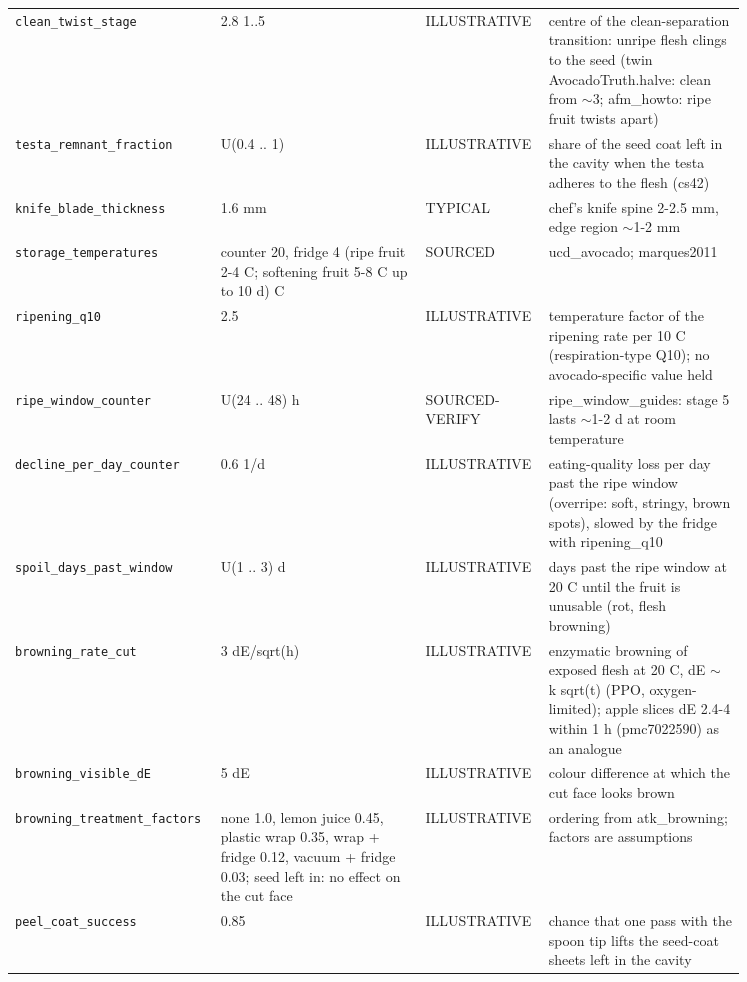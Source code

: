 \documentclass[10.5pt,a4paper]{article}
\begin{document}
{\begin{longtable}{@{}p{0.2\linewidth}p{0.27\linewidth}p{0.12\linewidth}p{0.26\linewidth}@{}}
\texttt{clean\_\allowbreak{}twist\_\allowbreak{}stage} & 2.8 1..5 & ILLUSTRATIVE & centre of the clean-separation transition: unripe flesh clings to the seed (twin AvocadoTruth.halve: clean from $\sim$3; afm\_howto: ripe fruit twists apart) \\
\texttt{testa\_\allowbreak{}remnant\_\allowbreak{}fraction} & U(0.4 .. 1) & ILLUSTRATIVE & share of the seed coat left in the cavity when the testa adheres to the flesh (cs42) \\
\texttt{knife\_\allowbreak{}blade\_\allowbreak{}thickness} & 1.6 mm & TYPICAL & chef's knife spine 2-2.5 mm, edge region $\sim$1-2 mm \\
\texttt{storage\_\allowbreak{}temperatures} & counter 20, fridge 4 (ripe fruit 2-4 C; softening fruit 5-8 C up to 10 d) C & SOURCED & ucd\_avocado; marques2011 \\
\texttt{ripening\_\allowbreak{}q10} & 2.5 & ILLUSTRATIVE & temperature factor of the ripening rate per 10 C (respiration-type Q10); no avocado-specific value held \\
\texttt{ripe\_\allowbreak{}window\_\allowbreak{}counter} & U(24 .. 48) h & SOURCED-VERIFY & ripe\_window\_guides: stage 5 lasts $\sim$1-2 d at room temperature \\
\texttt{decline\_\allowbreak{}per\_\allowbreak{}day\_\allowbreak{}counter} & 0.6 1/d & ILLUSTRATIVE & eating-quality loss per day past the ripe window (overripe: soft, stringy, brown spots), slowed by the fridge with ripening\_q10 \\
\texttt{spoil\_\allowbreak{}days\_\allowbreak{}past\_\allowbreak{}window} & U(1 .. 3) d & ILLUSTRATIVE & days past the ripe window at 20 C until the fruit is unusable (rot, flesh browning) \\
\texttt{browning\_\allowbreak{}rate\_\allowbreak{}cut} & 3 dE/sqrt(h) & ILLUSTRATIVE & enzymatic browning of exposed flesh at 20 C, dE $\sim$ k sqrt(t) (PPO, oxygen-limited); apple slices dE 2.4-4 within 1 h (pmc7022590) as an analogue \\
\texttt{browning\_\allowbreak{}visible\_\allowbreak{}dE} & 5 dE & ILLUSTRATIVE & colour difference at which the cut face looks brown \\
\texttt{browning\_\allowbreak{}treatment\_\allowbreak{}factors} & none 1.0, lemon juice 0.45, plastic wrap 0.35, wrap + fridge 0.12, vacuum + fridge 0.03; seed left in: no effect on the cut face & ILLUSTRATIVE & ordering from atk\_browning; factors are assumptions \\
\texttt{peel\_\allowbreak{}coat\_\allowbreak{}success} & 0.85 & ILLUSTRATIVE & chance that one pass with the spoon tip lifts the seed-coat sheets left in the cavity \\\bottomrule\end{longtable}}
\end{document}
